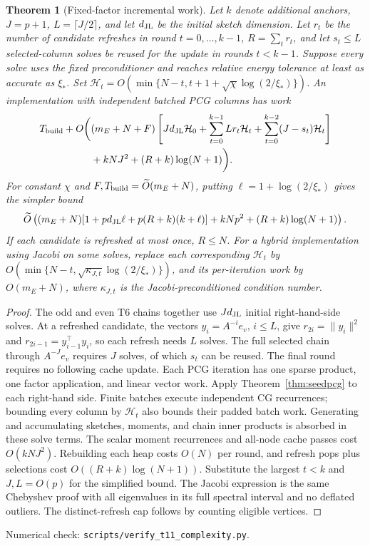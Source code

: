 \documentclass[11pt]{article}
\newtheorem{theorem}{Theorem}
\begin{document}
\begin{theorem}[Fixed-factor incremental work]\label{thm:inccost}
Let $k$ denote additional anchors, $J=p+1$, $L=\lceil J/2\rceil$,
and let $d_{\rm JL}$ be the initial sketch dimension. Let $r_t$
be the number of candidate refreshes in round $t=0,\ldots,k-1$,
$R=\sum_t r_t$, and let $s_t\leq L$ selected-column solves be
reused for the update in rounds $t<k-1$. Suppose every solve uses
the fixed preconditioner and reaches relative energy tolerance
at least as accurate as $\xi_*$. Set
$\mathcal H_t=O(\min\{N-t,t+1+\sqrt\chi\log(2/\xi_*)\})$.
An implementation with independent batched PCG columns has work
\begin{align*}
 T_{\rm build}+O\bigg(& (m_E+N+F)\left[
 Jd_{\rm JL}\mathcal H_0+
 \sum_{t=0}^{k-1}Lr_t\mathcal H_t+
 \sum_{t=0}^{k-2}(J-s_t)\mathcal H_t\right]\\
 &+kNJ^2+(R+k)\log(N+1)\bigg).
\end{align*}
For constant $\chi$ and $F,T_{\rm build}=\widetilde O(m_E+N)$,
putting $\ell=1+\log(2/\xi_*)$ gives the simpler bound
\[
 \widetilde O\left((m_E+N)
 [1+p d_{\rm JL}\ell+p(R+k)(k+\ell)]
       +kNp^2+(R+k)\log(N+1)\right).
\]
If each candidate is refreshed at most once, $R\leq N$.
For a hybrid implementation using Jacobi on some solves, replace
each corresponding $\mathcal H_t$ by
$O(\min\{N-t,\sqrt{\kappa_{J,t}}\log(2/\xi_*)\})$, and its
per-iteration work by $O(m_E+N)$, where $\kappa_{J,t}$ is the
Jacobi-preconditioned condition number.
\end{theorem}
\begin{proof}
The odd and even T6 chains together use $Jd_{\rm JL}$ initial
right-hand-side solves. At a refreshed candidate, the vectors
$y_i=A^{-i}e_v$, $i\leq L$, give
$r_{2i}=\|y_i\|^2$ and $r_{2i-1}=y_{i-1}^\top y_i$,
so each refresh needs $L$ solves. The full selected chain through
$A^{-J}e_v$ requires $J$ solves, of which $s_t$ can be reused.
The final round requires no following cache update. Each PCG
iteration has one sparse product, one factor application, and
linear vector work. Apply Theorem~\ref{thm:seedpcg} to each
right-hand side. Finite batches execute independent CG recurrences;
bounding every column by $\mathcal H_t$ also bounds their padded
batch work. Generating and accumulating sketches, moments, and
chain inner products is absorbed in these solve terms.
The scalar moment recurrences and all-node cache passes cost
$O(kNJ^2)$. Rebuilding each heap costs $O(N)$ per round, and
refresh pops plus selections cost $O((R+k)\log(N+1))$.
Substitute the largest $t<k$ and $J,L=O(p)$ for the simplified bound.
The Jacobi expression is the same Chebyshev proof with all
eigenvalues in its full spectral interval and no deflated outliers.
The distinct-refresh cap follows by counting eligible vertices.
\end{proof}
\noindent Numerical check: \texttt{scripts/verify\_t11\_complexity.py}.
\end{document}
